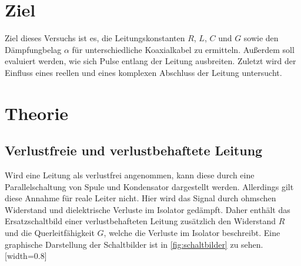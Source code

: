 \section{Ziel}
\label{sec:Ziel}
Ziel dieses Versuchs ist es, die Leitungskonstanten $R$, $L$, $C$ und $G$ sowie den Dämpfungbelag $\alpha$ für unterschiedliche Koaxialkabel zu ermitteln. Außerdem soll evaluiert werden, wie sich Pulse entlang der Leitung ausbreiten. Zuletzt wird der Einfluss eines reellen und eines komplexen Abschluss der Leitung untersucht.

\section{Theorie}
\label{sec:theorie}
\subsection{Verlustfreie und verlustbehaftete Leitung}
Wird eine Leitung als verlustfrei angenommen, kann diese durch eine Parallelschaltung von Spule und Kondensator dargestellt werden. Allerdings gilt diese Annahme für reale Leiter nicht. Hier wird das Signal durch ohmschen Widerstand und dielektrische Verluste im Isolator gedämpft. Daher enthält das Ersatzschaltbild einer verlustbehafteten Leitung zusätzlich den Widerstand $R$ und die Querleitfähigkeit $G$, welche die Verluste im Isolator beschreibt. Eine graphische Darstellung der Schaltbilder ist in \autoref{fig:schaltbilder} zu sehen.
[width=0.8\textwidth]

